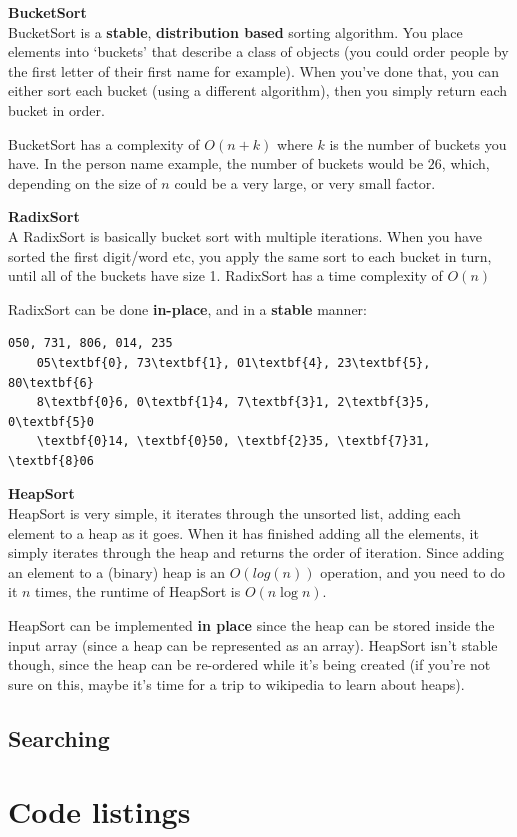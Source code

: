 \begin{description}
\item \textbf{BucketSort} \\
  BucketSort is a \textbf{stable}, \textbf{distribution based} sorting
  algorithm. You place elements into `buckets' that describe a class of objects
  (you could order people by the first letter of their first name for example).
  When you've done that, you can either sort each bucket (using a different
  algorithm), then you simply return each bucket in order.

  BucketSort has a complexity of $O(n + k)$ where $k$ is the number of buckets
  you have. In the person name example, the number of buckets would be $26$,
  which, depending on the size of $n$ could be a very large, or very small
  factor.

\item \textbf{RadixSort}\\
  A RadixSort is basically bucket sort with multiple iterations. When you have
  sorted the first digit/word etc, you apply the same sort to each bucket in
  turn, until all of the buckets have size 1. RadixSort has a time complexity of
  $O(n)$

  RadixSort can be done \textbf{in-place}, and in a \textbf{stable} manner:
  \begin{Verbatim}[commandchars=\\\{\},codes={\catcode`$=3\catcode`_=8}]
    050, 731, 806, 014, 235
    05\textbf{0}, 73\textbf{1}, 01\textbf{4}, 23\textbf{5}, 80\textbf{6}
    8\textbf{0}6, 0\textbf{1}4, 7\textbf{3}1, 2\textbf{3}5, 0\textbf{5}0
    \textbf{0}14, \textbf{0}50, \textbf{2}35, \textbf{7}31, \textbf{8}06
  \end{Verbatim}

\item \textbf{HeapSort} \\
  HeapSort is very simple, it iterates through the unsorted list, adding each
  element to a heap as it goes. When it has finished adding all the elements, it
  simply iterates through the heap and returns the order of iteration. Since
  adding an element to a (binary) heap is an $O(log(n))$ operation, and you need
  to do it $n$ times, the runtime of HeapSort is $O(n\log{n})$.

  HeapSort can be implemented \textbf{in place} since the heap can be stored
  inside the input array (since a heap can be represented as an array). HeapSort
  isn't stable though, since the heap can be re-ordered while it's being created
  (if you're not sure on this, maybe it's time for a trip to wikipedia to learn
  about heaps).

\end{description}

\subsection{Searching}




\section{Code listings}


